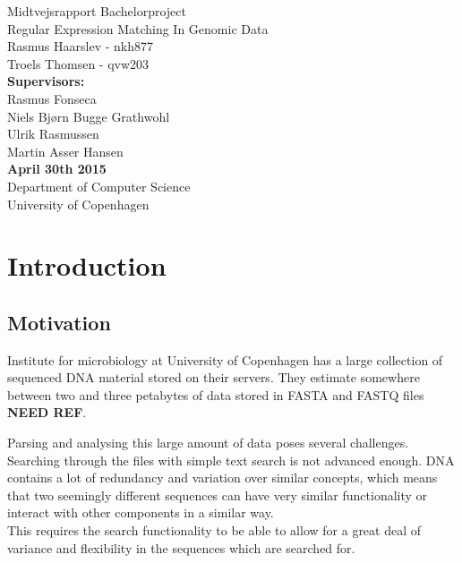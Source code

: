 \documentclass[12pt]{article}
\theoremstyle{definition}
\begin{document}
\begin{titlepage}
    \vspace*{\fill}
    \begin{center}
      {\Huge Midtvejsrapport Bachelorproject}\\[0.7cm]
      {\Large Regular Expression Matching In Genomic Data}\\[0.4cm]
      {\large Rasmus Haarslev - nkh877}\\
      {\large Troels Thomsen - qvw203}\\[0.4cm]
      {\textbf{Supervisors:}\\
      Rasmus Fonseca\\
      Niels Bjørn Bugge Grathwohl\\
      Ulrik Rasmussen\\
      Martin Asser Hansen}\\
      {\small \textbf{April 30th 2015}}\\[0.3cm] 
      {\small Department of Computer Science}\\
      {\small University of Copenhagen}
    \end{center}
    \vspace*{\fill}
\end{titlepage}	

\clearpage
{}
\thispagestyle{empty}

\newpage

\tableofcontents
\newpage


\section{Introduction}
\subsection{Motivation}

Institute for microbiology at University of Copenhagen has a large collection of sequenced DNA material stored on their servers. They estimate somewhere between two and three petabytes of data stored in FASTA and FASTQ files \textbf{NEED REF}.

Parsing and analysing this large amount of data poses several challenges. Searching through the files with simple text search is not advanced enough. DNA contains a lot of redundancy and variation over similar concepts, which means that two seemingly different sequences can have very similar functionality or interact with other components in a similar way. \\
This requires the search functionality to be able to allow for a great deal of variance and flexibility in the sequences which are searched for.
\end{document}
